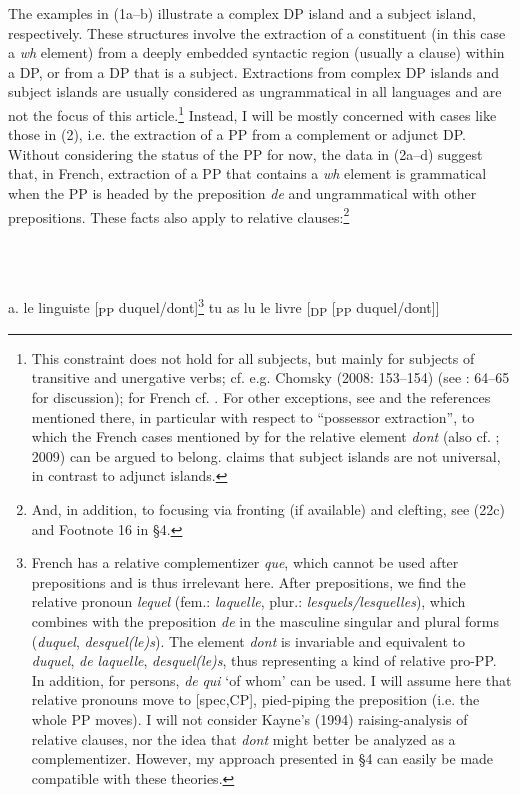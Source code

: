 \documentclass[output=paper]{langsci/langscibook}
\begin{document}
The examples in (1a–b) illustrate a complex DP island and a subject island, respectively. These structures involve the extraction of a constituent (in this case a \textit{wh} element) from a deeply embedded syntactic region (usually a clause) within a DP, or from a DP that is a subject. Extractions from complex DP islands and subject islands are usually considered as ungrammatical in all languages and are not the focus of this article.\footnote{This constraint does not hold for all subjects, but mainly for subjects of transitive and unergative verbs; cf. e.g. Chomsky (2008: 153–154) (see \citealt{Broekhuis2005}: 64–65 for discussion); for French cf. \citet[90]{Tellier1991}. For other exceptions, see \citet{Truswell2005} and the references mentioned there, in particular with respect to “possessor extraction”, to which the French cases mentioned by \citet{Tellier1990} for the relative element \textit{dont} (also cf. \citealt{Heck2008}; 2009) can be argued to belong. \citet{Stepanov2007} claims that subject islands are not universal, in contrast to adjunct islands.} Instead, I will be mostly concerned with cases like those in (2), i.e. the extraction of a PP from a complement or adjunct DP. Without considering the status of the PP for now, the data in (2a–d) suggest that, in French, extraction of a PP that contains a \textit{wh} element is grammatical when the PP is headed by the preposition \textit{de} and ungrammatical with other prepositions. These facts also apply to relative clauses:\footnote{And, in addition, to focusing via fronting (if available) and clefting, see (22c) and Footnote 16 in §4.}

\ea%
    \label{ex:key:3}
    \gll\\
        \\
    \glt
    \z

          a.   le  linguiste [\textsubscript{PP} duquel/dont]\footnote{French has a relative complementizer \textit{que}, which cannot be used after prepositions and is thus irrelevant here. After prepositions, we find the relative pronoun \textit{lequel} (fem.: \textit{laquelle}, plur.: \textit{lesquels/lesquelles}), which combines with the preposition \textit{de} in the masculine singular and plural forms (\textit{duquel}, \textit{desquel(le)s}). The element \textit{dont} is invariable and equivalent to \textit{duquel}, \textit{de laquelle}, \textit{desquel(le)s}, thus representing a kind of relative pro-PP. In addition, for persons, \textit{de} \textit{qui} ‘of whom’ can be used. I will assume here that relative pronouns move to [spec,CP], pied-piping the preposition (i.e. the whole PP moves). I will not consider Kayne’s (1994) raising-analysis of relative clauses, nor the idea that \textit{dont} might better be analyzed as a complementizer. However, my approach presented in §4 can easily be made compatible with these theories.}  tu  as  lu  le  livre [\textsubscript{DP} [\textsubscript{PP}        duquel/dont]]
\end{document}
